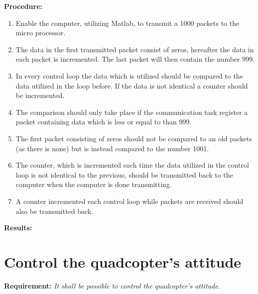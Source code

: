 \textbf{Procedure:}\\

\begin{enumerate}
	\item Enable the computer, utilizing Matlab, to transmit a 1000 packets to the micro processor.
	\item The data in the first transmitted packet consist of zeros, hereafter the data in each packet is incremented. The last packet will then contain the number 999. 
	\item In every control loop the data which is utilized should be compared to the data utilized in the loop before. If the data is not identical a counter should be incremented. 
	\item The comparison should only take place if the communication task register a packet containing data which is less or equal to than 999.
	\item The first packet consisting of zeros should not be compared to an old packets (as there is none) but is instead compared to the number 1001. 
	\item The counter, which is incremented each time the data utilized in the control loop is not identical to the previous, should be transmitted back to the computer when the computer is done transmitting.
	\item A counter incremented each control loop while packets are received should also be transmitted back.
\end{enumerate} 

\textbf{Results:}

\newpage

\section{Control the quadcopter's attitude} \label{sec:accepttestAttitude}
\textbf{Requirement:}
\textit{It shall be possible to control the quadcopter's attitude.}


